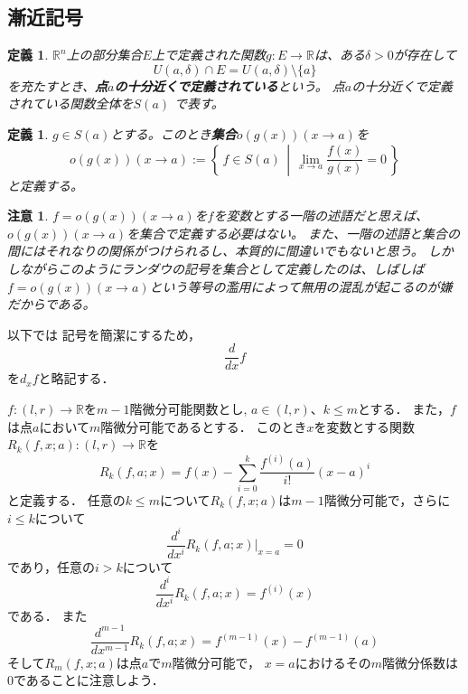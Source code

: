 \documentclass[leqno, a4paper, 12pt]{jsarticle}
\newtheorem{df}[thm]{定義}
\newtheorem*{rmk}{注意}
\newcommand{\rr}{\mathbb{R}}
\newcommand{\bbb}[2]{#1^{(#2)}}
\begin{document}
\subsection{漸近記号}

\begin{df}
$\rr^n$上の部分集合$E$上で定義された関数$g:E\to \rr$は、ある$\delta>0$が存在して
\[
U(a,\delta)\cap E=U(a, \delta)\setminus \{a\}
\]
を充たすとき、\textbf{点$a$の十分近くで定義されている}という。
点$a$の十分近くで定義されている関数全体を$S(a)$
で表す。
\end{df}
\begin{df}
$g\in S(a)$とする。このとき\textbf{集合}$o(g(x))(x\to a)$を
\[
o(g(x))(x\to a)
:=
\left\{\, 
f\in S(a)
\, \middle| \, 
 \lim_{x\to a}\frac{f(x)}{g(x)}=0
\, \right\}
\]
と定義する。
\end{df}
\begin{rmk}
$f=o(g(x))(x\to a)$を$f$を変数とする一階の述語だと思えば、$o(g(x))(x\to a)$を集合で定義する必要はない。
また、一階の述語と集合の間にはそれなりの関係がつけられるし、本質的に間違いでもないと思う。
しかしながらこのようにランダウの記号を集合として定義したのは、しばしば
$f=o(g(x))(x\to a)$という等号の濫用によって無用の混乱が起こるのが嫌だからである。
\end{rmk}

以下では
記号を簡潔にするため，
\[
\frac{d}{dx}f
\]
を$d_xf$と略記する．



$f:(l,r)\to \rr$を$m-1$階微分可能関数とし, 
$a\in (l,r)$、$k\le m$とする．
また，$f$は点$a$において$m$階微分可能であるとする．
このとき$x$を変数とする関数$R_k(f, x;a):(l,r)\to \rr$を
\[
R_k(f,a;x)=f(x)-\sum_{i=0}^{k}\frac{f^{(i)}(a)}{i!}(x-a)^i
\]
と定義する．
任意の$k\le m$について$R_k(f,x;a)$は$m-1$階微分可能で，さらに
$i\le k$について
\[
\frac{d^i}{dx^i}R_k(f, a; x)|_{x=a}=0
\]
であり，任意の$i>k$について
\[
\frac{d^i}{dx^i}R_k(f, a;x)=\bbb{f}{i}(x)
\]
である．
また
\[
\frac{d^{m-1}}{dx^{m-1}}R_k(f, a;x)=\bbb{f}{m-1}(x)-\bbb{f}{m-1}(a)
\]
そして$R_m(f,x;a)$は点$a$で$m$階微分可能で，
$x=a$におけるその$m$階微分係数は$0$であることに注意しよう．
\end{document}
